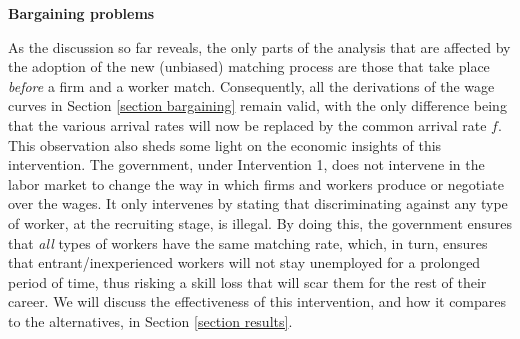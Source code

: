 \documentclass[12pt]{article} %
\theoremstyle{definition}
\begin{document}
\bigskip 

\noindent \textbf{Bargaining problems}

\noindent As the discussion so far reveals, the only parts of the analysis that are affected by the adoption of the new (unbiased) matching process are those that take place    \textit{before} a firm and a worker match. Consequently, all the derivations of the wage curves in Section \ref{section bargaining} remain valid, with the only difference being that the various arrival rates will now be replaced by the common arrival rate $f$. This observation also sheds some light on the economic insights of this intervention. The government, under Intervention 1, does not intervene in the labor market to change the way in which firms and workers produce or negotiate over the wages. It only intervenes by stating that discriminating against any type of worker, at the recruiting stage, is illegal. By doing this, the government ensures that \textit{all} types of workers have the same matching rate, which, in turn, ensures that entrant/inexperienced workers will not stay unemployed for a prolonged period of time, thus risking a skill loss that will scar them for the rest of their career. We will discuss the effectiveness of this intervention, and how it compares to the alternatives, in Section \ref{section results}. 
\end{document}
